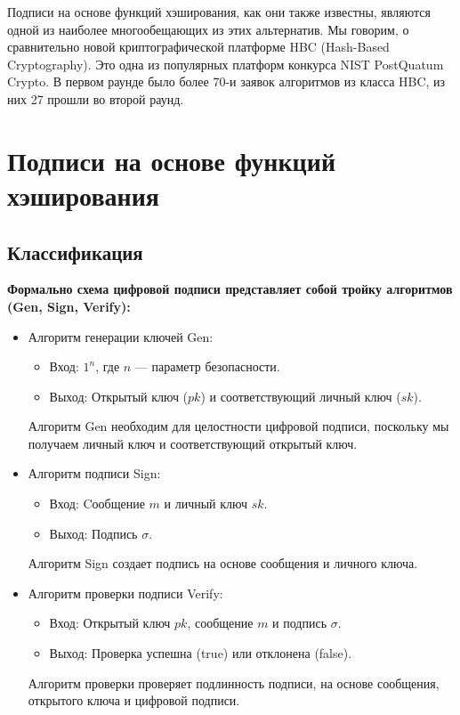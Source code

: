 \documentclass[a4paper, 14pt]{extarticle}
\begin{document}
Подписи на основе функций хэширования, как они также известны, являются одной из наиболее многообещающих из этих альтернатив. Мы говорим, о сравнительно новой криптографической платформе HBC (Hash-Based Cryptography). Это одна из популярных платформ конкурса NIST PostQuatum Crypto. В первом раунде было более 70-и заявок алгоритмов из класса HBC, из них 27 прошли во второй раунд.

\section{Подписи на основе функций хэширования}
\subsection{Классификация}

\textbf{Формально схема цифровой подписи представляет собой тройку алгоритмов (Gen, Sign, Verify):}

\begin{itemize}
    \item Алгоритм генерации ключей Gen:

    \begin{itemize}
        \item Вход: $1^{n}$, где $n$ --- параметр безопасности.
        \item Выход: Открытый ключ ($pk$) и соответствующий личный ключ ($sk$).
    \end{itemize}

    Алгоритм Gen необходим для целостности цифровой подписи, поскольку мы получаем личный ключ и соответствующий открытый ключ.

    \item Алгоритм подписи Sign:

    \begin{itemize}
        \item Вход: Cообщение $m$ и личный ключ $sk$.
        \item Выход: Подпись $\sigma$.
    \end{itemize}

    Алгоритм Sign создает подпись на основе сообщения и личного ключа.

    \newpage

    \item Алгоритм проверки подписи Verify:

    \begin{itemize}
        \item Вход: Открытый ключ $pk$, сообщение $m$ и подпись $\sigma$.
        \item Выход: Проверка успешна (true) или отклонена (false).
    \end{itemize}

    Алгоритм проверки проверяет подлинность подписи, на основе сообщения, открытого ключа и цифровой подписи.
\end{itemize}
\end{document}
